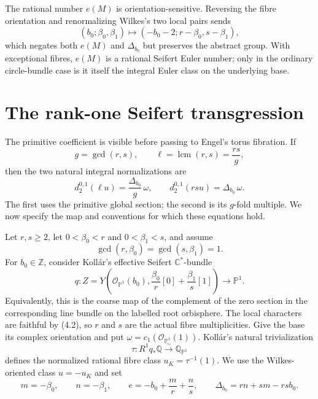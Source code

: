 \documentclass[11pt]{article}
\numberwithin{equation}{section}
\begin{document}
\begin{remark}
The rational number $e(M)$ is orientation-sensitive.  Reversing the fibre
orientation and renormalizing Wilkes's two local pairs sends
\[
 (b_0;\beta_0,\beta_1)
   \longmapsto(-b_0-2;r-\beta_0,s-\beta_1),
\]
which negates both $e(M)$ and $\Delta_{b_0}$ but preserves the abstract
group.  With exceptional fibres, $e(M)$ is a rational Seifert Euler number;
only in the ordinary circle-bundle case is it itself the integral Euler
class on the underlying base.
\end{remark}

\section{The rank-one Seifert transgression}

The primitive coefficient is visible before passing to Engel's torus
fibration.  If
\[
 g=\gcd(r,s),\qquad \ell=\operatorname{lcm}(r,s)=\frac{rs}{g},
\]
then the two natural integral normalizations are
\[
 d_2^{0,1}(\ell u)=\frac{\Delta_{b_0}}g\,\omega,
 \qquad
 d_2^{0,1}(rsu)=\Delta_{b_0}\,\omega.                            \tag{4.1}
\]
The first uses the primitive global section; the second is its $g$-fold
multiple.  We now specify the map and conventions for which these equations
hold.

Let $r,s\ge2$, let $0<\beta_0<r$ and $0<\beta_1<s$, and assume
\[
 \gcd(r,\beta_0)=\gcd(s,\beta_1)=1.                              \tag{4.2}
\]
For $b_0\in\mathbb Z$, consider Koll\'ar's effective Seifert
$\mathbb C^*$-bundle
\[
 q:Z=Y\left(\mathcal O_{\mathbb P^1}(b_0),
       \frac{\beta_0}{r}[0]+\frac{\beta_1}{s}[1]\right)
       \longrightarrow\mathbb P^1.                              \tag{4.3}
\]
Equivalently, this is the coarse map of the complement of the zero section
in the corresponding line bundle on the labelled root orbisphere.  The local
characters are faithful by (4.2), so $r$ and $s$ are the actual fibre
multiplicities.  Give the base its complex orientation and put
$\omega=c_1(\mathcal O_{\mathbb P^1}(1))$.  Koll\'ar's natural
trivialization
\[
 \tau:R^1q_*\mathbb Q\xrightarrow{\sim}\mathbb Q_{\mathbb P^1}
\]
defines the normalized rational fibre class $u_K=\tau^{-1}(1)$.  We use the
Wilkes-oriented class $u=-u_K$ and set
\[
 m=-\beta_0,\qquad n=-\beta_1,
 \qquad e=-b_0+\frac mr+\frac ns,
 \qquad \Delta_{b_0}=rn+sm-rsb_0.                               \tag{4.4}
\]
\end{document}
